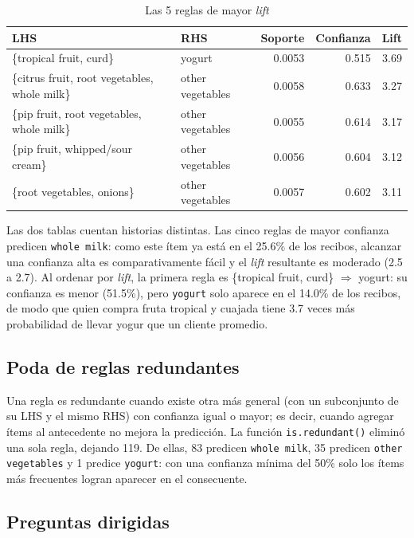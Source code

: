 \documentclass[11pt,a4paper]{article}
\begin{document}
\begin{table}[H]
  \centering
  \caption{Las 5 reglas de mayor \emph{lift}}
  \label{tab:lift}
  \small
  \begin{tabular}{llrrr}
    \toprule
    LHS & RHS & Soporte & Confianza & Lift \\
    \midrule
    \{tropical fruit, curd\} & yogurt & 0.0053 & 0.515 & 3.69 \\
    \{citrus fruit, root vegetables, whole milk\} & other vegetables & 0.0058 & 0.633 & 3.27 \\
    \{pip fruit, root vegetables, whole milk\} & other vegetables & 0.0055 & 0.614 & 3.17 \\
    \{pip fruit, whipped/sour cream\} & other vegetables & 0.0056 & 0.604 & 3.12 \\
    \{root vegetables, onions\} & other vegetables & 0.0057 & 0.602 & 3.11 \\
    \bottomrule
  \end{tabular}
\end{table}

Las dos tablas cuentan historias distintas. Las cinco reglas de mayor confianza predicen
\texttt{whole milk}: como este ítem ya está en el 25.6\% de los recibos, alcanzar una
confianza alta es comparativamente fácil y el \emph{lift} resultante es moderado (2.5 a 2.7).
Al ordenar por \emph{lift}, la primera regla es \{tropical fruit, curd\} $\Rightarrow$ yogurt:
su confianza es menor (51.5\%), pero \texttt{yogurt} solo aparece en el 14.0\% de los recibos,
de modo que quien compra fruta tropical y cuajada tiene 3.7 veces más probabilidad de llevar
yogur que un cliente promedio.

\subsection{Poda de reglas redundantes}

Una regla es redundante cuando existe otra más general (con un subconjunto de su LHS y el
mismo RHS) con confianza igual o mayor; es decir, cuando agregar ítems al antecedente no
mejora la predicción. La función \texttt{is.redundant()} eliminó una sola regla, dejando 119.
De ellas, 83 predicen \texttt{whole milk}, 35 predicen \texttt{other vegetables} y 1 predice
\texttt{yogurt}: con una confianza mínima del 50\% solo los ítems más frecuentes logran
aparecer en el consecuente.

\subsection{Preguntas dirigidas}
\end{document}
